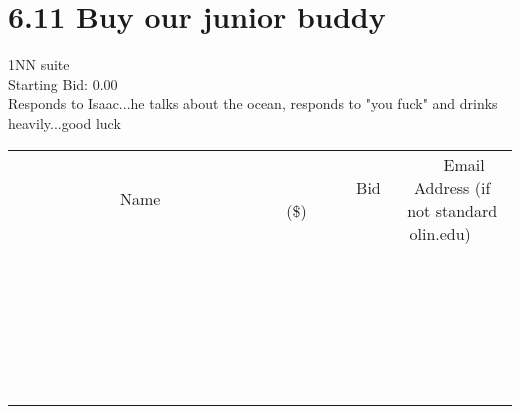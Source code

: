 \documentclass[11pt]{article}
\begin{document}
					\section*{6.11 Buy our junior buddy}
					1NN suite \\
					Starting Bid: 0.00 \\
					Responds to Isaac...he talks about the ocean, responds to "you fuck" and drinks heavily...good luck \\
					[6ex]
					\begin{tabular}{c c c}
						~~~~~~~~~~~~~Name~~~~~~~~~~~~~ & ~~~~~~~~~Bid (\$)~~~~~~~~~ & ~~~Email Address (if not standard olin.edu)~~~ \\
				
 & & \\
\hline
 & & \\
\hline
 & & \\
\hline
 & & \\
\hline
 & & \\
\hline
 & & \\
\hline
 & & \\
\hline
 & & \\
\hline
 & & \\
\hline
 & & \\
\hline
 & & \\
\hline
 & & \\
\hline
 & & \\
\hline
 & & \\
\hline
 & & \\
\hline
 & & \\
\hline
 & & \\
\hline
 & & \\
\hline
 & & \\
\hline
 & & \\
\hline
 & & \\
\hline
 & & \\
\hline
 & & \\
\hline
 & & \\
\hline
 & & \\
\hline
 & & \\
\hline
					\end{tabular}
					\clearpage
				
\end{document}
